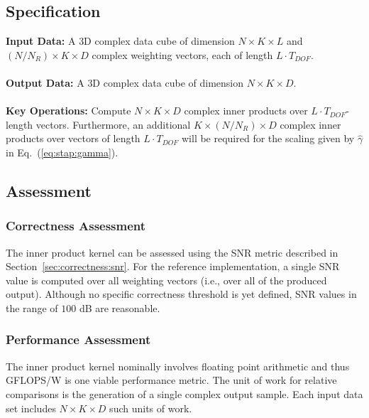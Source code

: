 \documentclass{report}
\begin{document}
\subsection{Specification}
\label{sec:stap:adaptive_weighting:spec}

\textbf{Input Data:}
A {3D} complex data cube of dimension
$N \times K \times L$ and $(N/N_R) \times K \times D$ complex
weighting vectors, each of length $L \cdot T_{DOF}$. \\ \\
\textbf{Output Data:}
A {3D} complex data cube of dimension $N \times K \times D$. \\ \\
\textbf{Key Operations:}
Compute $N \times K \times D$ complex inner products over $L \cdot T_{DOF}$-length
vectors.  Furthermore, an additional $K \times (N/N_R) \times D$ complex
inner products over vectors of length $L \cdot T_{DOF}$ will be required for
the scaling given by $\hat{\gamma}$ in Eq.~(\ref{eq:stap:gamma}).

\subsection{Assessment}

\subsubsection{Correctness Assessment}

The inner product kernel can be assessed using the SNR metric described
in Section~\ref{sec:correctness:snr}.
For the reference implementation, a single SNR value is computed over all
weighting vectors (i.e., over all of the produced output).
Although no specific correctness threshold is yet defined, SNR values in the
range of $100$ dB are reasonable.

\subsubsection{Performance Assessment}

The inner product kernel nominally involves floating point arithmetic and
thus GFLOPS/W is one viable performance metric.
The unit of work for relative comparisons is the generation of a single
complex output sample.
Each input data set includes $N \times K \times D$ such units of work.


\end{document}
